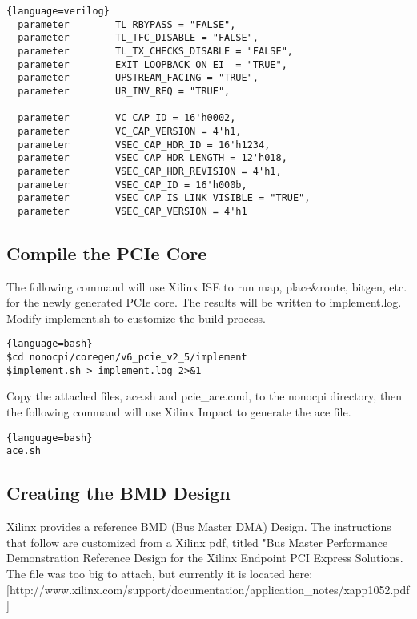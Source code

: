 \begin{lstlisting}{language=verilog}
  parameter        TL_RBYPASS = "FALSE", 
  parameter        TL_TFC_DISABLE = "FALSE", 
  parameter        TL_TX_CHECKS_DISABLE = "FALSE", 
  parameter        EXIT_LOOPBACK_ON_EI  = "TRUE", 
  parameter        UPSTREAM_FACING = "TRUE", 
  parameter        UR_INV_REQ = "TRUE", 

  parameter        VC_CAP_ID = 16'h0002, 
  parameter        VC_CAP_VERSION = 4'h1, 
  parameter        VSEC_CAP_HDR_ID = 16'h1234, 
  parameter        VSEC_CAP_HDR_LENGTH = 12'h018, 
  parameter        VSEC_CAP_HDR_REVISION = 4'h1, 
  parameter        VSEC_CAP_ID = 16'h000b, 
  parameter        VSEC_CAP_IS_LINK_VISIBLE = "TRUE", 
  parameter        VSEC_CAP_VERSION = 4'h1 

\end{lstlisting}  

\subsection{Compile the PCIe Core}

The following command will use Xilinx ISE to run map, place\&route, bitgen, etc. for the newly generated PCIe core.  The results will be written to implement.log.  Modify implement.sh to customize the build process.

\begin{lstlisting}{language=bash}
$cd nonocpi/coregen/v6_pcie_v2_5/implement
$implement.sh > implement.log 2>&1
\end{lstlisting}

Copy the attached files, ace.sh and pcie\_ace.cmd, to the nonocpi directory, then the following command will use Xilinx Impact to generate the ace file.   


\begin{lstlisting}{language=bash}
ace.sh
\end{lstlisting}

\subsection{Creating the BMD Design}

Xilinx provides a reference BMD (Bus Master DMA) Design.  The instructions that follow are customized from a Xilinx pdf, titled "Bus Master Performance Demonstration Reference Design for the Xilinx Endpoint PCI Express Solutions.  The file was too big to attach, but currently it is located here:[http://www.xilinx.com/support/documentation/application\_notes/xapp1052.pdf]


